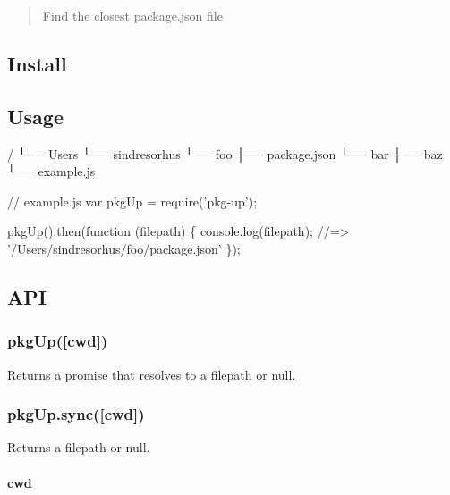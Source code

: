 \begin{quote}
Find the closest package.\+json file \end{quote}


\subsection*{Install}




\subsection*{Usage}


\begin{DoxyCode}
/
└── Users
    └── sindresorhus
        └── foo
            ├── package.json
            └── bar
                ├── baz
                └── example.js
\end{DoxyCode}



\begin{DoxyCode}
// example.js
var pkgUp = require('pkg-up');

pkgUp().then(function (filepath) \{
    console.log(filepath);
    //=> '/Users/sindresorhus/foo/package.json'
\});
\end{DoxyCode}


\subsection*{A\+PI}

\subsubsection*{pkg\+Up(\mbox{[}cwd\mbox{]})}

Returns a promise that resolves to a filepath or {\ttfamily null}.

\subsubsection*{pkg\+Up.\+sync(\mbox{[}cwd\mbox{]})}

Returns a filepath or {\ttfamily null}.

\paragraph*{cwd}


